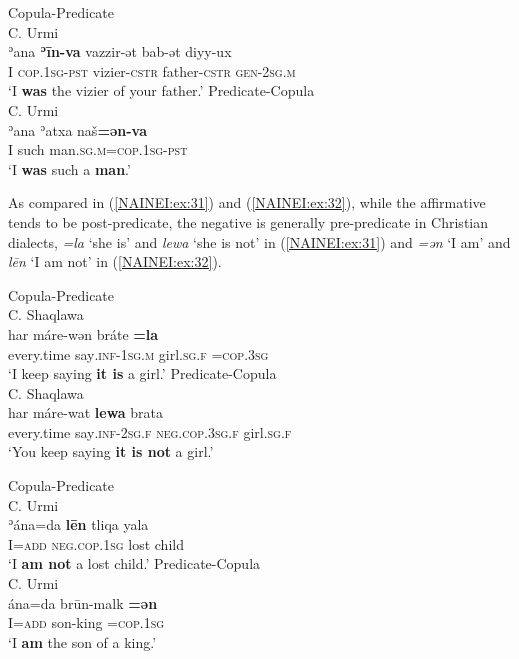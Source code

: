 \documentclass[output=paper,colorlinks,citecolor=brown,draftmode]{langscibook}
\begin{document}
\ea
\ea\label{NAINEI:ex:30a}
Copula-Predicate\\
C. Urmi \citep[A2:\S 25]{Khan2016CUrmi} \\
\gll ʾana \textbf{ʾīn-va} vazzir-ət bab-ət diyy-ux \\
     I \textsc{cop.1sg-pst} vizier\textsc{-cstr} father\textsc{-cstr} \textsc{gen-2sg.m} \\
\glt `I \textbf{was} the vizier of your father.'
\ex\label{NAINEI:ex:30b}
Predicate-Copula\\
C. Urmi \citep[A2:\S 25]{Khan2016CUrmi} \\
\gll ʾana ʾatxa naš\textbf{=ən-va} \\
    I such man\textsc{.sg.m=cop.1sg-pst} \\
\glt `I \textbf{was} such a \textbf{man}.'
\z
\z

\begin{sloppypar}
As compared in (\ref{NAINEI:ex:31}) and (\ref{NAINEI:ex:32}), while the affirmative  tends to be post-predicate, the negative  is generally pre-predicate  in Christian dialects,  \textit{=la} `she is' and \textit{lewa} `she is not' in (\ref{NAINEI:ex:31}) and \textit{=ən} `I am' and \textit{lēn} `I am not' in (\ref{NAINEI:ex:32}).
\end{sloppypar}

\ea\label{NAINEI:ex:31}
\ea\label{NAINEI:ex:31a}
Copula-Predicate\\
C. Shaqlawa \citep[Text 23:§28]{Khanetal2022FolkloreII}\\
\gll har máre-wən bráte \textbf{=la}  \\
     every.time say\textsc{.inf-1sg.m} girl\textsc{.sg.f} \textsc{=cop.3sg} \\
\glt `I keep saying \textbf{it is} a girl.' 
\ex\label{NAINEI:ex:31b}
Predicate-Copula\\
C. Shaqlawa \citep[Text 23:§28]{Khanetal2022FolkloreII}\\
\gll har máre-wat \textbf{lewa} brata \\
    every.time say\textsc{.inf-2sg.f} \textsc{neg.cop.3sg.f} girl\textsc{.sg.f} \\
\glt `You keep saying \textbf{it is not} a girl.'
\z
\z

\ea\label{NAINEI:ex:32}
\ea\label{NAINEI:ex:32a}
Copula-Predicate\\
C. Urmi \citep[A43:\S 15]{Khan2016CUrmi} \\
\gll ʾána=da \textbf{lēn} tliqa yala \\
     I\textsc{=add} \textsc{neg.cop.1sg} lost child \\
\glt `I \textbf{am not} a lost child.'
\ex\label{NAINEI:ex:32b}
Predicate-Copula\\
C. Urmi \citep[A43:\S 15]{Khan2016CUrmi} \\
\gll ána=da brūn-malk \textbf{=ən} \\
    I\textsc{=add} son-king \textsc{=cop.1sg}  \\
\glt `I \textbf{am} the son of a king.' 
\z
\z
\end{document}
